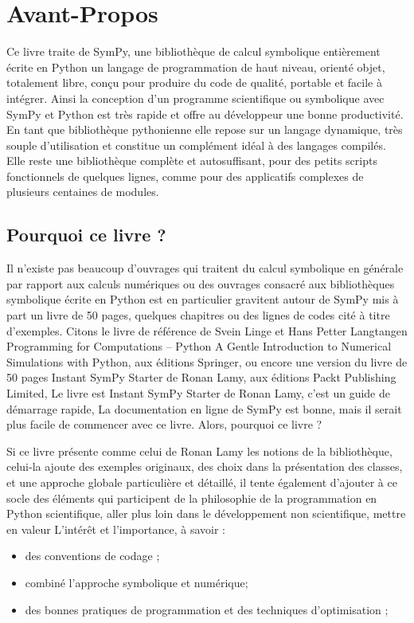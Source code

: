 \section{Avant-Propos}
Ce livre traite de SymPy, une bibliothèque de calcul symbolique entièrement écrite en Python un langage 
de programmation de haut niveau, orienté objet, totalement libre, conçu pour produire 
du code de qualité, portable et facile à intégrer. Ainsi la conception d'un programme scientifique  ou 
symbolique avec SymPy et Python est très rapide et offre au développeur une bonne productivité. En tant 
que bibliothèque pythonienne elle repose sur un langage dynamique, très souple d'utilisation et 
constitue un complément idéal à des langages compilés. Elle reste une bibliothèque complète et autosuffisant, pour des petits scripts fonctionnels de quelques lignes, comme pour des applicatifs complexes de plusieurs centaines de modules.

\subsection*{Pourquoi ce livre ?}
Il n'existe pas beaucoup d'ouvrages qui traitent du calcul symbolique en générale par  
rapport aux calculs numériques ou des ouvrages consacré aux bibliothèques symbolique écrite en Python 
est en particulier gravitent autour de SymPy mis à part un livre de 50 pages, quelques chapitres ou des 
lignes de codes cité à titre d'exemples. Citons le livre de référence de Svein Linge et Hans Petter 
Langtangen Programming for Computations – Python A Gentle Introduction to Numerical Simulations with 
Python, aux éditions Springer, ou encore une version du livre de 50 pages Instant SymPy Starter de Ronan 
Lamy, aux éditions Packt Publishing Limited, Le livre est Instant SymPy Starter de Ronan Lamy, c'est un 
guide de démarrage rapide, La documentation en ligne de SymPy est bonne, mais il serait plus facile de 
commencer avec ce livre. Alors, pourquoi ce livre ?

Si ce livre présente comme celui de Ronan Lamy les notions de la bibliothèque, celui-la ajoute des  
exemples originaux, des choix dans la présentation des classes, et une approche globale particulière et 
détaillé, il tente également d’ajouter à ce socle des éléments qui participent de la philosophie de la 
programmation en Python scientifique, aller plus loin dans le développement non scientifique, mettre en 
valeur L'intérêt et l'importance, à savoir :
\begin{itemize}
 \item des conventions de codage ;
 \item combiné l'approche symbolique et numérique;
 \item des bonnes pratiques de programmation et des techniques d’optimisation ;
\end{itemize}

